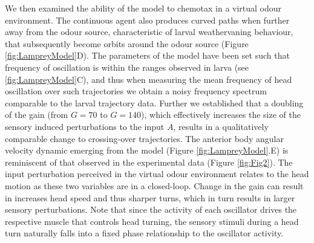 \documentclass[10pt,a4paper]{article}
\begin{document}
We then examined the ability of the model to chemotax in a virtual odour environment. The continuous agent also produces curved paths when further away from the odour source, characteristic of larval weathervaning behaviour, that subsequently become orbits around the odour source (Figure \ref{fig:LampreyModel}D). The parameters of the model have been set such that frequency of oscillation is within the ranges observed in larva (see \ref{fig:LampreyModel}C), and thus when measuring the mean frequency of head oscillation over such trajectories we obtain a noisy frequency spectrum comparable to the larval trajectory data. Further we established that a doubling of the gain (from $G=70$ to $G=140$), which effectively increases the size of the sensory induced perturbations to the input $A$, results in a qualitatively comparable change to crossing-over trajectories. The anterior body angular velocity dynamic emerging from the model (Figure \ref{fig:LampreyModel}.E) is reminiscent of that observed in the experimental data (Figure \ref{fig:Fig2}). The input perturbation perceived in the virtual odour environment relates to the head motion as these two variables are in a closed-loop. Change in the gain can result in increases head speed and thus sharper turns, which in turn results in larger sensory perturbations. Note that since the activity of each oscillator drives the respective muscle that controls head turning, the sensory stimuli during a head turn naturally falls into a fixed phase relationship to the oscillator activity.
\end{document}
